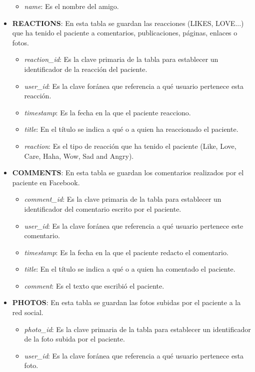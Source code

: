 \begin{itemize}
\begin{itemize}
		\item \textit{ name}: Es el nombre del amigo.
	\end{itemize}
	\item \textbf{ REACTIONS}: En esta tabla se guardan las reacciones (LIKES, LOVE...) que ha tenido el paciente a comentarios, publicaciones, páginas, enlaces o fotos.
	\begin{itemize}
		\item \textit{ reaction\_id}: Es la clave primaria de la tabla para establecer un identificador de la reacción del paciente.
		\item \textit{ user\_id}: Es la clave foránea que referencia a qué usuario pertenece esta reacción.
		\item \textit{ timestamp}: Es la fecha en la que el paciente reacciono.
		\item \textit{ title}: En el título se indica a qué o a quien ha reaccionado el paciente.
		\item \textit{ reaction}: Es el tipo de reacción que ha tenido el paciente (Like, Love, Care, Haha, Wow, Sad and Angry).
	\end{itemize}
	\item \textbf{ COMMENTS}: En esta tabla se guardan los comentarios realizados por el paciente en Facebook.
	\begin{itemize}
		\item \textit{ comment\_id}: Es la clave primaria de la tabla para establecer un identificador del comentario escrito por el paciente.
		\item \textit{ user\_id}: Es la clave foránea que referencia a qué usuario pertenece este comentario.
		\item \textit{ timestamp}: Es la fecha en la que el paciente redacto el comentario.
		\item \textit{ title}: En el título se indica a qué o a quien ha comentado el paciente.
		\item \textit{ comment}: Es el texto que escribió el paciente.
	\end{itemize}
	\item \textbf{ PHOTOS}: En esta tabla se guardan las fotos subidas por el paciente a la red social.
	\begin{itemize}
		\item \textit{ photo\_id}: Es la clave primaria de la tabla para establecer un identificador de la foto subida por el paciente.
		\item \textit{ user\_id}: Es la clave foránea que referencia a qué usuario pertenece esta foto.

\end{itemize}
\end{itemize}
